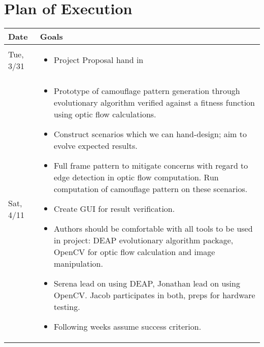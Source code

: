 \documentclass[11pt,letter]{article}
\begin{document}
\section{Plan of Execution}

\begin{table}[h]
\begin{tabular}{|p{} | p{}|}
\hline
	\textbf{Date} & \textbf{Goals} \\
\hline
Tue, 3/31 & \begin{itemize} \item Project Proposal hand in                                                                                                                                                                                                                                                                                                                                                                                                                                                                                                                                                                                                                                                                                                                                                                                       \end{itemize} \\
\hline
Sat, 4/11 & \begin{itemize} \item Prototype of camouflage pattern generation through evolutionary algorithm verified against a fitness function using optic flow calculations. \item Construct scenarios which we can hand-design; aim to evolve expected results. \item Full frame pattern to mitigate concerns with regard to edge detection in optic flow computation. Run computation of camouflage pattern on these scenarios. \item Create GUI for result verification. \item Authors should be comfortable with all tools to be used in project: DEAP evolutionary algorithm package, OpenCV for optic flow calculation and image manipulation. \item Serena lead on using DEAP, Jonathan lead on using OpenCV. Jacob participates in both, preps for hardware testing. \item Following weeks assume success criterion. \end{itemize} \\ \hline

\end{tabular}
\end{table}
\end{document}

